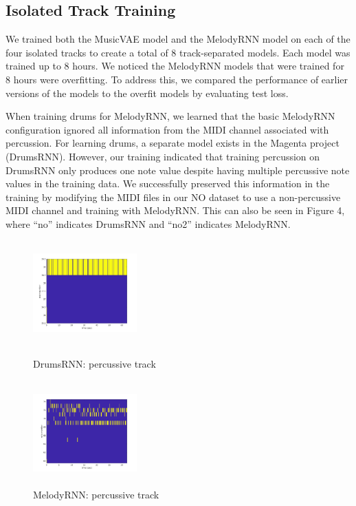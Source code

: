 \documentclass{article}
\begin{document}
\subsection{Isolated Track Training}
We trained both the MusicVAE model and the MelodyRNN model on each of the four isolated tracks to create a total of 8 track-separated models. Each model was trained up to 8 hours. We noticed the MelodyRNN models that were trained for 8 hours were overfitting. To address this, we compared the performance of earlier versions of the models to the overfit models by evaluating test loss.

When training drums for MelodyRNN, we learned that the basic MelodyRNN configuration ignored all information from the MIDI channel associated with percussion. For learning drums, a separate model exists in the Magenta project (DrumsRNN). However, our training indicated that training percussion on DrumsRNN only produces one note value despite having multiple percussive note values in the training data. We successfully preserved this information in the training by modifying the MIDI files in our NO dataset to use a non-percussive MIDI channel and training with MelodyRNN. This can also be seen in Figure 4, where “no” indicates DrumsRNN and “no2” indicates MelodyRNN.


\begin{figure}[htb!]
  \begin{minipage}{0.48\textwidth}
    \centering
    \includegraphics[height=4cm, width=4cm]{img/DrumRNN_drum.jpg}
    \caption{DrumsRNN: percussive track}
  \end{minipage}\hfill
  \begin{minipage}{0.48\textwidth}
    \centering
    \includegraphics[height=4cm, width=4cm]{img/MelodyRNN_drum.jpg}
    \caption{MelodyRNN: percussive track}
  \end{minipage}
\end{figure}
\end{document}
